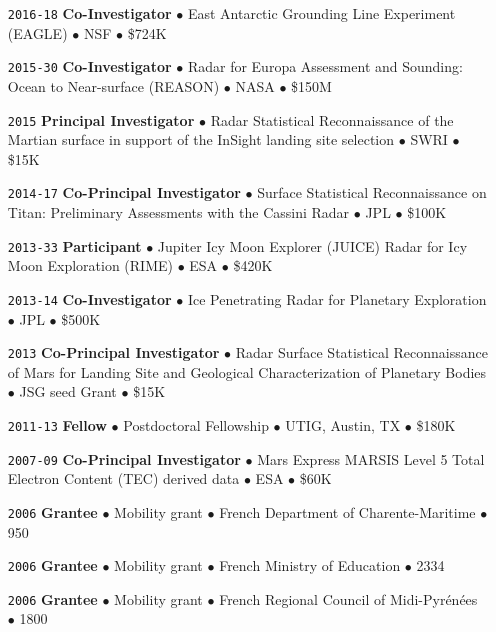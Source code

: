 \begin{itemize}[leftmargin=5.8em, labelsep=1.5em]
    \item[\texttt{2016-18}] \textbf{Co-Investigator} $\bullet$ East Antarctic Grounding Line Experiment (EAGLE) $\bullet$ NSF $\bullet$ \$724K
    
    \item[\texttt{2015-30}] \textbf{Co-Investigator} $\bullet$ Radar for Europa Assessment and Sounding: Ocean to Near-surface (REASON) $\bullet$ NASA $\bullet$ \$150M
    
    \item[\texttt{2015}] \textbf{Principal Investigator} $\bullet$ Radar Statistical Reconnaissance of the Martian surface in support of the InSight landing site selection $\bullet$ SWRI $\bullet$ \$15K
    
    \item[\texttt{2014-17}] \textbf{Co-Principal Investigator} $\bullet$ Surface Statistical Reconnaissance on Titan: Preliminary Assessments with the Cassini Radar $\bullet$ JPL $\bullet$ \$100K
    
    \item[\texttt{2013-33}] \textbf{Participant} $\bullet$ Jupiter Icy Moon  Explorer (JUICE) Radar for Icy Moon Exploration (RIME) $\bullet$ ESA $\bullet$ \$420K
    
    \item[\texttt{2013-14}] \textbf{Co-Investigator} $\bullet$ Ice Penetrating Radar for Planetary Exploration $\bullet$ JPL $\bullet$ \$500K
    
    \item[\texttt{2013}] \textbf{Co-Principal Investigator} $\bullet$ Radar Surface Statistical Reconnaissance of Mars for Landing Site and Geological Characterization of Planetary Bodies $\bullet$ JSG seed Grant $\bullet$ \$15K
    
    \item[\texttt{2011-13}] \textbf{Fellow} $\bullet$ Postdoctoral Fellowship $\bullet$ UTIG, Austin, TX $\bullet$ \$180K
    
    \item[\texttt{2007-09}] \textbf{Co-Principal Investigator} $\bullet$ Mars Express MARSIS Level 5 Total Electron Content (TEC) derived data $\bullet$ ESA $\bullet$ \$60K

    \item[\texttt{2006}] \textbf{Grantee} $\bullet$ Mobility grant $\bullet$ French Department of Charente-Maritime $\bullet$ 950 \texteuro

    \item[\texttt{2006}] \textbf{Grantee} $\bullet$ Mobility grant $\bullet$ French Ministry of Education $\bullet$ 2334 \texteuro
    
    \item[\texttt{2006}] \textbf{Grantee} $\bullet$ Mobility grant $\bullet$ French Regional Council of Midi-Pyrénées $\bullet$ 1800 \texteuro
    
\end{itemize}